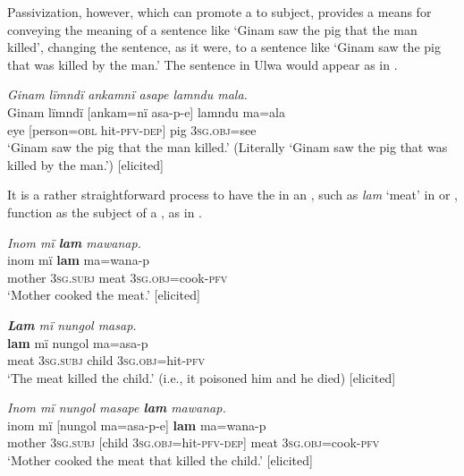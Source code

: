   Passivization, however, which can promote a  to subject, provides a means for conveying the meaning of a sentence like ‘Ginam saw the pig that the man killed’, changing the sentence, as it were, to a sentence like ‘Ginam saw the pig that was killed by the man.’ The sentence in Ulwa would appear as in .

\ea%
    \label{ex:syntax:287}
          \textit{Ginam lïmndï ankamnï asape lamndu mala.}\\
\gll    Ginam  lïmndï  [ankam=nï    asa-p-e]    lamndu  ma=ala\\
    [name]  eye    [person=\textsc{obl}  hit-\textsc{pfv-dep]}  pig      3\textsc{sg.obj}=see\\
\glt `Ginam saw the pig that the man killed.’ (Literally ‘Ginam saw the pig that was killed by the man.’) [elicited]
\z

It is a rather straightforward process to have the  in an , such as \textit{lam} ‘meat’ in  or , function as the subject of a , as in .

\ea%
    \label{ex:syntax:288}
          \textit{Inom mï \textbf{lam} mawanap.}\\
\gll    inom  mï      \textbf{lam}  ma=wana-p\\
    mother  3\textsc{sg.subj}  meat  3\textsc{sg.obj}=cook-\textsc{pfv}\\
\glt `Mother cooked the meat.’ [elicited]
\z

\ea%
    \label{ex:syntax:289}
          \textit{\textbf{Lam} mï nungol masap.}\\
\gll    \textbf{lam}  mï      nungol  ma=asa-p\\
    meat  3\textsc{sg.subj}  child  3\textsc{sg.obj}=hit-\textsc{pfv}\\
\glt `The meat killed the child.’ (i.e., it poisoned him and he died) [elicited]
\z

\ea%
    \label{ex:syntax:290}
          \textit{Inom mï nungol masape \textbf{lam} mawanap.}\\
\gll    inom  mï      [nungol  ma=asa-p-e]      \textbf{lam} ma=wana-p\\
    mother  3\textsc{sg.subj}  [child    3\textsc{sg.obj}=hit-\textsc{pfv-dep]}  meat     \textsc{3sg.obj}=cook-\textsc{pfv}\\
\glt `Mother cooked the meat that killed the child.’ [elicited]
\z

